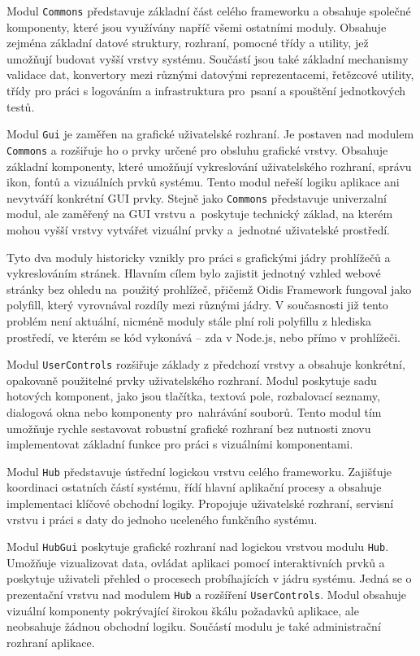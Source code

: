 Modul \texttt{Commons} představuje základní část celého frameworku a obsahuje společné komponenty, které jsou využívány napříč všemi ostatními moduly. Obsahuje zejména základní datové struktury, rozhraní, pomocné třídy a utility, jež umožňují budovat vyšší vrstvy systému. Součástí jsou také základní mechanismy validace dat, konvertory mezi různými datovými reprezentacemi, řetězcové utility, třídy pro práci s logováním a infrastruktura pro~psaní a spouštění jednotkových testů.

Modul \texttt{Gui} je zaměřen na grafické uživatelské rozhraní. Je postaven nad modulem \texttt{Commons} a rozšiřuje ho o prvky určené pro obsluhu grafické vrstvy. Obsahuje základní komponenty, které umožňují vykreslování uživatelského rozhraní, správu ikon, fontů a vizuálních prvků systému. Tento modul neřeší logiku aplikace ani nevytváří konkrétní GUI prvky. Stejně jako \texttt{Commons} představuje univerzalní modul, ale zaměřený na GUI vrstvu a~poskytuje technický základ, na kterém mohou vyšší vrstvy vytvářet vizuální prvky a~jednotné uživatelské prostředí.

Tyto dva moduly historicky vznikly pro práci s grafickými jádry prohlížečů a vykreslováním stránek. Hlavním cílem bylo zajistit jednotný vzhled webové stránky bez ohledu na~použitý prohlížeč, přičemž Oidis Framework fungoval jako polyfill, který vyrovnával rozdíly mezi různými jádry. V současnosti již tento problém není aktuální, nicméně moduly stále plní roli polyfillu z hlediska prostředí, ve kterém se kód vykonává -- zda v Node.js, nebo přímo v prohlížeči.

Modul \texttt{UserControls} rozšiřuje základy z předchozí vrstvy a obsahuje konkrétní, opakovaně použitelné prvky uživatelského rozhraní. Modul poskytuje sadu  hotových komponent, jako jsou tlačítka, textová pole, rozbalovací seznamy, dialogová okna nebo komponenty pro~nahrávání souborů. Tento modul tím umožňuje rychle sestavovat robustní grafické rozhraní bez nutnosti znovu implementovat základní funkce pro práci s vizuálními komponentami.

Modul \texttt{Hub} představuje ústřední logickou vrstvu celého frameworku. Zajišťuje koordinaci ostatních částí systému, řídí hlavní aplikační procesy a obsahuje implementaci klíčové obchodní logiky. Propojuje uživatelské rozhraní, servisní vrstvu i práci s daty do jednoho uceleného funkčního systému.

Modul \texttt{HubGui} poskytuje grafické rozhraní nad logickou vrstvou modulu \texttt{Hub}. Umožňuje vizualizovat data, ovládat aplikaci pomocí interaktivních prvků a poskytuje uživateli přehled o procesech probíhajících v jádru systému. Jedná se o prezentační vrstvu nad modulem \texttt{Hub} a rozšíření \texttt{UserControls}. Modul obsahuje vizuální komponenty pokrývající širokou škálu požadavků aplikace, ale neobsahuje žádnou obchodní logiku. Součástí modulu je také administrační rozhraní aplikace.

